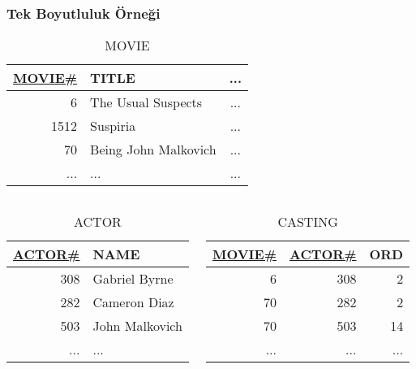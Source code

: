 \documentclass[dvipsnames]{beamer}
\theoremstyle{plain}
\begin{document}
\begin{frame}
  \frametitle{Tek Boyutluluk Örneği}

  \begin{footnotesize}
  \begin{table}
    \caption{MOVIE}
    \begin{tabular}{|r|l|c|}\hline
\underline{MOVIE\#} & TITLE                & ...\\[2pt]\hline\hline
                  6 & The Usual Suspects   & ...\\\hline
               1512 & Suspiria             & ...\\\hline
                 70 & Being John Malkovich & ...\\\hline
                ... & ...                  & ...\\\hline
    \end{tabular}
  \end{table}
  \end{footnotesize}

  \vspace{-12pt}
  \begin{columns}[t]
    \begin{footnotesize}
    \begin{table}
      \caption{ACTOR}
      \begin{tabular}{|r|l|}\hline
\underline{ACTOR\#} & NAME          \\[2pt]\hline\hline
                308 & Gabriel Byrne \\\hline
                282 & Cameron Diaz  \\\hline
                503 & John Malkovich\\\hline
                ... & ...           \\\hline
      \end{tabular}
    \end{table}
    \end{footnotesize}

    \begin{footnotesize}
    \begin{table}
      \caption{CASTING}
      \begin{tabular}{|r|r|r|}\hline
\underline{MOVIE\#} & \underline{ACTOR\#} & ORD\\[2pt]\hline\hline
                  6 &                 308 &   2\\\hline
                 70 &                 282 &   2\\\hline
                 70 &                 503 &  14\\\hline
                ... &                 ... & ...\\\hline
      \end{tabular}
    \end{table}
    \end{footnotesize}
  \end{columns}
\end{frame}
\end{document}
